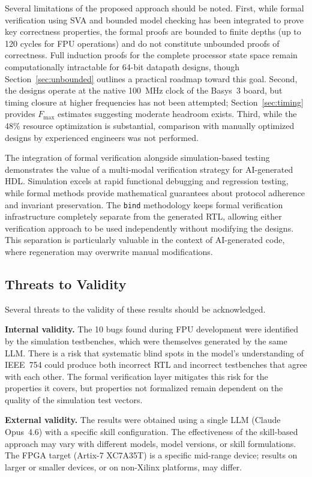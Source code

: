 \documentclass[journal]{IEEEtran}
\begin{document}
Several limitations of the proposed approach should be noted.  First,
while formal verification using SVA and bounded model checking has been
integrated to prove key correctness properties, the formal proofs are
bounded to finite depths (up to 120 cycles for FPU operations) and do
not constitute unbounded proofs of correctness.  Full induction proofs
for the complete processor state space remain computationally intractable
for 64-bit datapath designs, though Section~\ref{sec:unbounded} outlines
a practical roadmap toward this goal.  Second, the designs operate at the
native 100~MHz clock of the Basys~3 board, but timing closure at higher
frequencies has not been attempted; Section~\ref{sec:timing} provides
$F_{\max}$ estimates suggesting moderate headroom exists.  Third, while
the 48\% resource optimization is substantial, comparison with manually
optimized designs by experienced engineers was not performed.

The integration of formal verification alongside simulation-based testing
demonstrates the value of a multi-modal verification strategy for
AI-generated HDL.  Simulation excels at rapid functional debugging and
regression testing, while formal methods provide mathematical guarantees
about protocol adherence and invariant preservation.  The \texttt{bind}
methodology keeps formal verification infrastructure completely separate
from the generated RTL, allowing either verification approach to be used
independently without modifying the designs.  This separation is
particularly valuable in the context of AI-generated code, where
regeneration may overwrite manual modifications.

\subsection{Threats to Validity}

Several threats to the validity of these results should be acknowledged.

\textbf{Internal validity.}  The 10 bugs found during FPU development
were identified by the simulation testbenches, which were themselves
generated by the same LLM.  There is a risk that systematic blind spots
in the model's understanding of IEEE~754 could produce both incorrect
RTL and incorrect testbenches that agree with each other.  The formal
verification layer mitigates this risk for the properties it covers, but
properties not formalized remain dependent on the quality of the
simulation test vectors.

\textbf{External validity.}  The results were obtained using a single
LLM (Claude Opus~4.6) with a specific skill configuration.  The
effectiveness of the skill-based approach may vary with different models,
model versions, or skill formulations.  The FPGA target (Artix-7
XC7A35T) is a specific mid-range device; results on larger or smaller
devices, or on non-Xilinx platforms, may differ.
\end{document}
